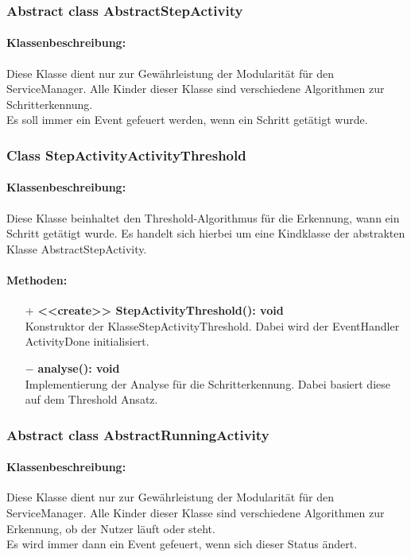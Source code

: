 \documentclass[a4paper,12pt]{article}
\begin{document}
	\subsubsection{Abstract class AbstractStepActivity}
	\paragraph{Klassenbeschreibung:}
	Diese Klasse dient nur zur Gewährleistung der Modularität für den ServiceManager. Alle Kinder dieser Klasse sind verschiedene Algorithmen zur Schritterkennung.\\ Es soll immer ein Event gefeuert werden, wenn ein Schritt getätigt wurde.
	\subsubsection{Class StepActivityActivityThreshold}
	\paragraph{Klassenbeschreibung:}
	Diese Klasse beinhaltet den Threshold-Algorithmus für die Erkennung, wann ein Schritt getätigt wurde. Es handelt sich hierbei um eine Kindklasse der abstrakten Klasse AbstractStepActivity. 
	\paragraph{Methoden:}
	\begin{itemize}
		\item [+]\textbf{<<create>> StepActivityThreshold(): void}\\Konstruktor der KlasseStepActivityThreshold. Dabei wird der EventHandler ActivityDone initialisiert. 
		\item [$-$]\textbf{analyse(): void}\\ Implementierung der Analyse für die Schritterkennung. Dabei basiert diese auf dem Threshold Ansatz.  
	\end{itemize}
	
	\subsubsection{Abstract class AbstractRunningActivity}
	\paragraph{Klassenbeschreibung:}
	Diese Klasse dient nur zur Gewährleistung der Modularität für den ServiceManager. Alle Kinder dieser Klasse sind verschiedene Algorithmen zur Erkennung, ob der Nutzer läuft oder steht.\\ Es wird immer dann ein Event gefeuert, wenn sich dieser Status ändert.
	
\end{document}
